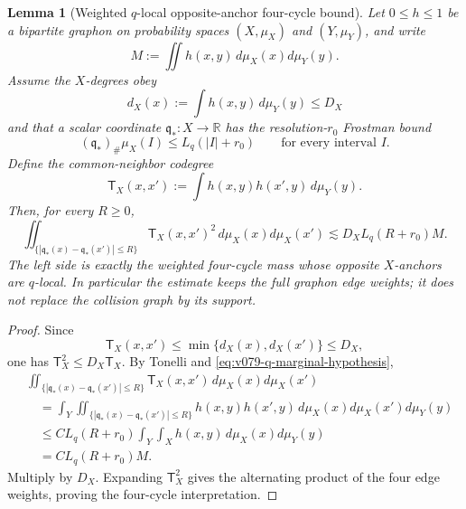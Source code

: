 \documentclass[10pt]{article}
\newtheorem{lemma}[theorem]{Lemma}
\begin{document}
\begin{lemma}[Weighted \(q\)-local opposite-anchor four-cycle bound]
\label{lem:v079-q-local-anchor-codegree}
Let \(0\le h\le1\) be a bipartite graphon on probability spaces
\((X,\mu_X)\) and \((Y,\mu_Y)\), and write
\[
M
:=
\iint h(x,y)\,d\mu_X(x)d\mu_Y(y).
\]
Assume the \(X\)-degrees obey
\[
d_X(x):=\int h(x,y)\,d\mu_Y(y)\le D_X
\]
and that a scalar coordinate \(\mathfrak q_*:X\to\mathbb R\) has the resolution-\(r_0\)
Frostman bound
\begin{equation}
\label{eq:v079-q-marginal-hypothesis}
(\mathfrak q_*)_\#\mu_X(I)
\le
L_q(|I|+r_0)
\qquad\text{for every interval }I.
\end{equation}
Define the common-neighbor codegree
\[
\mathsf T_X(x,x')
:=
\int h(x,y)h(x',y)\,d\mu_Y(y).
\]
Then, for every \(R\ge0\),
\begin{equation}
\label{eq:v079-q-local-codegree-square}
\boxed{
\iint_{\{|\mathfrak q_*(x)-\mathfrak q_*(x')|\le R\}}
\mathsf T_X(x,x')^2
\,d\mu_X(x)d\mu_X(x')
\lesssim
D_XL_q(R+r_0)M.
}
\end{equation}
The left side is exactly the weighted four-cycle mass whose opposite \(X\)-anchors are
\(q\)-local.  In particular the estimate keeps the full graphon edge weights; it does not replace
the collision graph by its support.
\end{lemma}

\begin{proof}
Since
\[
\mathsf T_X(x,x')
\le
\min\{d_X(x),d_X(x')\}
\le D_X,
\]
one has \(\mathsf T_X^2\le D_X\mathsf T_X\).  By Tonelli and
\eqref{eq:v079-q-marginal-hypothesis},
\[
\begin{aligned}
&\iint_{\{|\mathfrak q_*(x)-\mathfrak q_*(x')|\le R\}}
\mathsf T_X(x,x')
\,d\mu_X(x)d\mu_X(x')
\\
&\quad=
\int_Y
\iint_{\{|\mathfrak q_*(x)-\mathfrak q_*(x')|\le R\}}
h(x,y)h(x',y)
\,d\mu_X(x)d\mu_X(x')d\mu_Y(y)
\\
&\quad\le
C L_q(R+r_0)
\int_Y\int_X h(x,y)\,d\mu_X(x)d\mu_Y(y)
\\
&\quad=
C L_q(R+r_0)M.
\end{aligned}
\]
Multiply by \(D_X\).  Expanding \(\mathsf T_X^2\) gives the alternating product of the four
edge weights, proving the four-cycle interpretation.
\end{proof}
\end{document}
